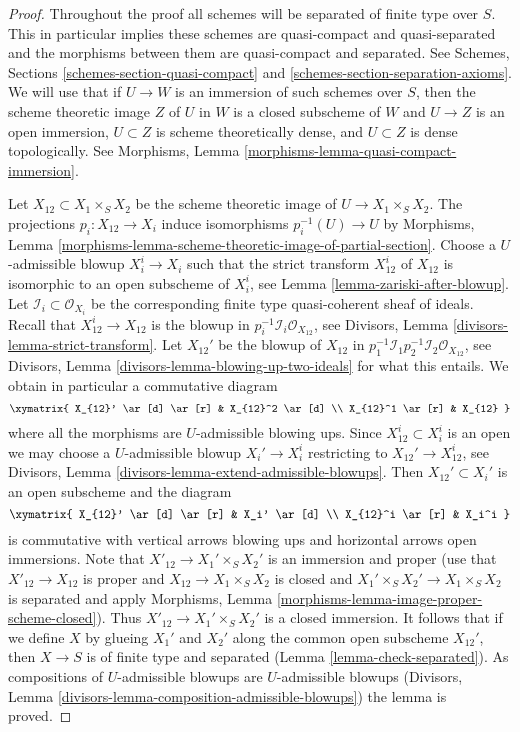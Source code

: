 \begin{proof}
Throughout the proof all schemes will be separated of finite type over $S$.
This in particular implies these schemes are quasi-compact and quasi-separated
and the morphisms between them are quasi-compact and separated.
See Schemes, Sections \ref{schemes-section-quasi-compact} and
\ref{schemes-section-separation-axioms}.
We will use that if $U \to W$ is an immersion of such schemes over $S$,
then the scheme theoretic image $Z$ of $U$ in $W$ is a closed subscheme
of $W$ and $U \to Z$ is an open immersion, $U \subset Z$ is scheme
theoretically dense, and $U \subset Z$ is dense topologically. See
Morphisms, Lemma
\ref{morphisms-lemma-quasi-compact-immersion}.

\medskip\noindent
Let $X_{12} \subset X_1 \times_S X_2$ be the scheme theoretic image
of $U \to X_1 \times_S X_2$. The projections $p_i : X_{12} \to X_i$
induce isomorphisms $p_i^{-1}(U) \to U$ by
Morphisms, Lemma
\ref{morphisms-lemma-scheme-theoretic-image-of-partial-section}.
Choose a $U$-admissible blowup $X_i^i \to X_i$ such that
the strict transform $X_{12}^i$ of $X_{12}$ is isomorphic to an
open subscheme of $X_i^i$, see
Lemma \ref{lemma-zariski-after-blowup}.
Let $\mathcal{I}_i \subset \mathcal{O}_{X_i}$ be the corresponding
finite type quasi-coherent sheaf of ideals.
Recall that $X_{12}^i \to X_{12}$ is the blowup in
$p_i^{-1}\mathcal{I}_i \mathcal{O}_{X_{12}}$, see
Divisors, Lemma \ref{divisors-lemma-strict-transform}.
Let $X_{12}'$ be the blowup of $X_{12}$ in
$p_1^{-1}\mathcal{I}_1 p_2^{-1}\mathcal{I}_2 \mathcal{O}_{X_{12}}$, see
Divisors, Lemma \ref{divisors-lemma-blowing-up-two-ideals}
for what this entails. We obtain in particular a commutative diagram
$$
\xymatrix{
X_{12}' \ar[d] \ar[r] & X_{12}^2 \ar[d] \\
X_{12}^1 \ar[r] & X_{12}
}
$$
where all the morphisms are $U$-admissible blowing ups.
Since $X_{12}^i \subset X_i^i$ is an open we may choose a $U$-admissible blowup
$X_i' \to X_i^i$ restricting to $X_{12}' \to X_{12}^i$, see
Divisors, Lemma \ref{divisors-lemma-extend-admissible-blowups}.
Then $X_{12}' \subset X_i'$ is an open subscheme and the diagram
$$
\xymatrix{
X_{12}' \ar[d] \ar[r] & X_i' \ar[d] \\
X_{12}^i \ar[r] & X_i^i
}
$$
is commutative with vertical arrows blowing ups and horizontal arrows
open immersions. Note that $X'_{12} \to X_1' \times_S X_2'$ is
an immersion and proper (use that $X'_{12} \to X_{12}$ is proper
and $X_{12} \to X_1 \times_S X_2$ is closed and $X_1' \times_S X_2' \to
X_1 \times_S X_2$ is separated and apply Morphisms, Lemma
\ref{morphisms-lemma-image-proper-scheme-closed}).
Thus $X'_{12} \to  X_1' \times_S X_2'$ is a closed immersion.
It follows that if we define $X$ by glueing $X_1'$ and $X_2'$
along the common open subscheme $X_{12}'$, then $X \to S$ is of finite type
and separated (Lemma \ref{lemma-check-separated}).
As compositions of $U$-admissible blowups are $U$-admissible blowups
(Divisors, Lemma \ref{divisors-lemma-composition-admissible-blowups})
the lemma is proved.
\end{proof}

